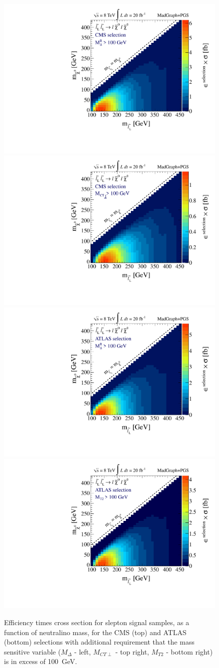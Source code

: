 \begin{figure}[ht]
\includegraphics[width=0.35\columnwidth]{fig/sectionIII/XSEC_sleptonL_CMS_Mdelta100.pdf}
\includegraphics[width=0.35\columnwidth]{fig/sectionIII/XSEC_sleptonL_CMS_MCTperp100.pdf}\\
\includegraphics[width=0.35\columnwidth]{fig/sectionIII/XSEC_sleptonL_ATLAS_Mdelta100.pdf}
\includegraphics[width=0.35\columnwidth]{fig/sectionIII/XSEC_sleptonL_ATLAS_MT2100.pdf}
\caption{Efficiency times cross section for slepton signal samples, as a function of neutralino mass, for the CMS (top) and ATLAS (bottom) selections with additional requirement that the mass sensitive variable ($M_{\Delta}$ - left, $M_{CT\perp}$ - top right, $M_{T2}$ - bottom right) is in excess of 100~GeV. \label{fig:XSEC_M100_slepton}}
\end{figure}

